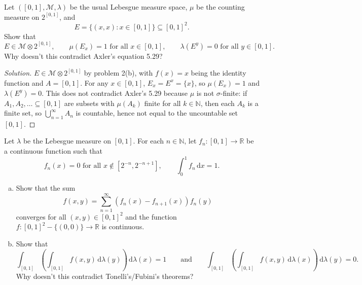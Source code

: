 \documentclass[10pt]{article}
\newcommand{\dd}{\,\mathrm{d}}
\providecommand{\NN}{\mathbb N}
\providecommand{\RR}{\mathbb R}
\providecommand{\ii}{\item}
\newenvironment{soln}{\begin{proof}[Solution]}{\end{proof}}
\begin{document}
\begin{problem}
    Let $([0,1],\mathcal M,\lambda)$ be the usual Lebesgue measure space,
    $\mu$ be the counting measure on $2^{[0,1]}$, and
    \begin{equation*}
	E = \{(x,x) : x\in[0,1]\}\subseteq[0,1]^2.
    \end{equation*}
    Show that
    \begin{equation*}
        E\in\mathcal M\otimes 2^{[0,1]},\qquad
	\mu(E_x) = 1\text{ for all }x\in[0,1],\qquad
	\lambda(E^y) = 0\text{ for all }y\in[0,1].
    \end{equation*}
    Why doesn't this contradict Axler's equation 5.29?
\end{problem}

\begin{soln}
    $E\in\mathcal M\otimes 2^{[0,1]}$ by problem 2(b), with $f(x) = x$
    being the identity function and $A = [0,1]$.
    For any $x\in[0,1]$, $E_x = E^x = \{x\}$, so
    $\mu(E_x) = 1$ and $\lambda(E^y) = 0$.
    This does not contradict Axler's 5.29 because
    $\mu$ is not $\sigma$-finite: if $A_1,A_2,\ldots\subseteq[0,1]$
    are subsets with $\mu(A_k)$ finite for all $k\in\NN$, then
    each $A_k$ is a finite set, so $\bigcup_{n=1}^\infty A_n$
    is countable, hence not equal to the uncountable set $[0,1]$.
\end{soln}

\begin{problem}
    Let $\lambda$ be the Lebesgue measure on $[0,1]$.
    For each $n\in\NN$, let $f_n\colon[0,1]\to\RR$ be
    a continuous function such that
    \begin{equation*}
	f_n(x) = 0\text{ for all }x\notin[2^{-n},2^{-n+1}],\qquad
	\int_0^1f_n\dd x = 1.
    \end{equation*}
    \begin{enumerate}[(a)]
        \ii Show that the sum
	\begin{equation*}
	    f(x,y) = \sum_{n=1}^\infty (f_n(x) - f_{n+1}(x))f_n(y)
	\end{equation*}
	converges for all $(x,y)\in[0,1]^2$ and the function
	$f\colon [0,1]^2-\{(0,0)\}\to\RR$ is continuous.
	\ii Show that
	\begin{equation*}
	    \int_{[0,1]}\left(\int_{[0,1]}f(x,y)\dd\lambda(y)\right)\dd\lambda(x) = 1
	    \qquad\text{and}\qquad
	    \int_{[0,1]}\left(\int_{[0,1]}f(x,y)\dd\lambda(x)\right)\dd\lambda(y) = 0.
	\end{equation*}
	Why doesn't this contradict Tonelli's/Fubini's theorems?
    \end{enumerate}
\end{problem}
\end{document}
